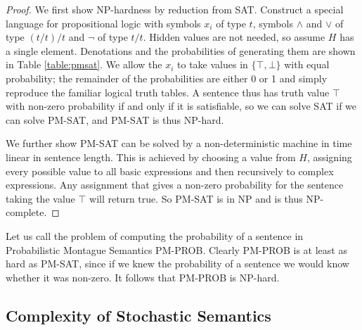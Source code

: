\documentclass[a4paper,11pt]{article}
\theoremstyle{definition}
\begin{document}
\begin{proof}
We first show NP-hardness by reduction from SAT. Construct a special
language for propositional logic with symbols $x_i$ of type $t$,
symbols $\land$ and $\lor$ of type $(t/t)/t$ and $\lnot$ of type
$t/t$. Hidden values are not needed, so assume $H$ has a single
element. Denotations and the probabilities of generating them are
shown in Table \ref{table:pmsat}.  We allow the $x_i$ to take values
in $\{\top, \bot\}$ with equal probability; the remainder of the
probabilities are either 0 or 1 and simply reproduce the familiar
logical truth tables. A sentence thus has truth value $\top$ with
non-zero probability if and only if it is satisfiable, so we can solve
SAT if we can solve PM-SAT, and PM-SAT is thus NP-hard.

We further show PM-SAT can be solved by a non-deterministic machine in
time linear in sentence length. This is achieved by choosing a value
from $H$, assigning every possible value to all basic expressions and
then recursively to complex expressions. Any assignment that gives a
non-zero probability for the sentence taking the value $\top$ will
return true. So PM-SAT is in NP and is thus NP-complete.
\end{proof}

Let us call the problem of computing the probability of a sentence in
Probabilistic Montague Semantics PM-PROB. Clearly PM-PROB is at least
as hard as PM-SAT, since if we knew the probability of a sentence we
would know whether it was non-zero. It follows that PM-PROB is NP-hard.

\subsection{Complexity of Stochastic Semantics}
\end{document}
